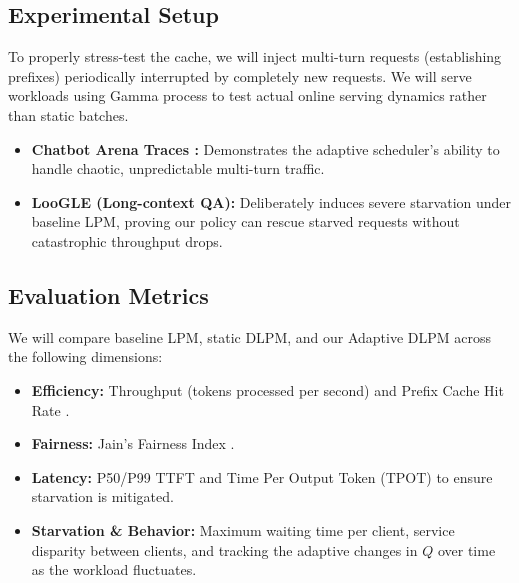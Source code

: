 \documentclass{article}
\begin{document}
\subsection{Experimental Setup}
To properly stress-test the cache, we will inject multi-turn requests (establishing prefixes) periodically interrupted by completely new requests. We will serve workloads using Gamma process to test actual online serving dynamics rather than static batches. 
\begin{itemize}
    \item \textbf{Chatbot Arena Traces \cite{judging_llm_as_a_judge_mt_bench_chatbot_arena}:} Demonstrates the adaptive scheduler's ability to handle chaotic, unpredictable multi-turn traffic.
    \item \textbf{LooGLE (Long-context QA)\cite{loogle_long_context_language_models}:}  Deliberately induces severe starvation under baseline LPM, proving our policy can rescue starved requests without catastrophic throughput drops.
\end{itemize}

\subsection{Evaluation Metrics}
We will compare baseline LPM, static DLPM, and our Adaptive DLPM across the following dimensions:
\begin{itemize}
    \item \textbf{Efficiency:} Throughput (tokens processed per second) and Prefix Cache Hit Rate \cite{sglang}.
    \item \textbf{Fairness:} Jain's Fairness Index \cite{jain1984fairness}.
    \item \textbf{Latency:} P50/P99 TTFT and Time Per Output Token (TPOT) to ensure starvation is mitigated.
    \item \textbf{Starvation \& Behavior:} Maximum waiting time per client, service disparity between clients, and tracking the adaptive changes in $Q$ over time as the workload fluctuates.
\end{itemize}

\nocite{google_gemini}
\nocite{CHIU19891}


\end{document}
